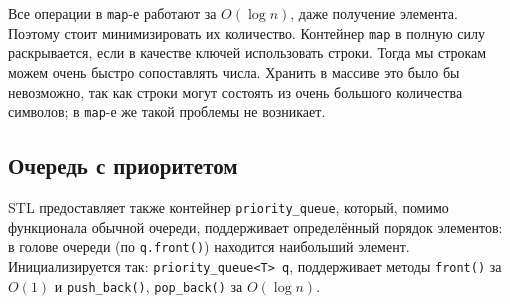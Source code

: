 Все операции в \texttt{map}-е работают за $O(\log n)$, даже получение элемента. Поэтому стоит минимизировать их количество. Контейнер \texttt{map} в полную силу раскрывается, если в качестве ключей использовать строки. Тогда мы строкам можем очень быстро сопоставлять числа. Хранить в массиве это было бы невозможно, так как строки могут состоять из очень большого количества символов; в \texttt{map}-е же такой проблемы не возникает.

\subsection{Очередь с приоритетом}

STL предоставляет также контейнер \texttt{priority\_queue}, который, помимо функционала обычной очереди, поддерживает определённый порядок элементов: в голове очереди (по \texttt{q.front()}) находится наибольший элемент. Инициализируется так: \texttt{priority\_queue<T> q}, поддерживает методы \texttt{front()} за $O(1)$ и \texttt{push\_back()}, \texttt{pop\_back()} за $O(\log n)$.

